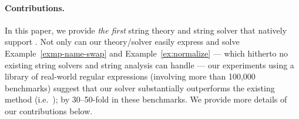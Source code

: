 {%
}



\paragraph*{Contributions.}
In this paper, we provide \emph{the first} string theory and string solver that
natively support \regexp{}. Not only can our theory/solver easily express and 
solve Example~\ref{exmp-name-swap} and Example~\ref{ex:normalize} --- which hitherto no 
existing string solvers and string analysis can handle --- our experiments
using a library of real-world regular expressions (involving more than 100,000
benchmarks) suggest that our solver substantially outperforms the existing 
method (i.e.~\cite{LMK19}); by 30--50-fold in these benchmarks.
We provide more details of our contributions below.

